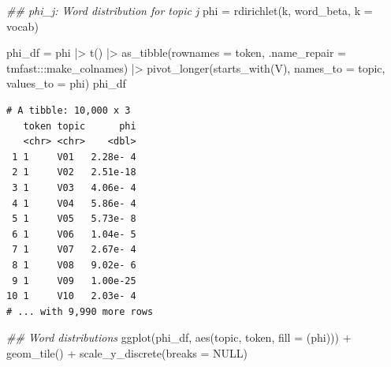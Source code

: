 \documentclass[
]{article}
\newenvironment{Shaded}{\begin{snugshade}}{\end{snugshade}}
\newcommand{\AttributeTok}[1]{\textcolor[rgb]{0.40,0.45,0.13}{#1}}
\newcommand{\ConstantTok}[1]{\textcolor[rgb]{0.56,0.35,0.01}{#1}}
\newcommand{\DocumentationTok}[1]{\textcolor[rgb]{0.37,0.37,0.37}{\textit{#1}}}
\newcommand{\FunctionTok}[1]{\textcolor[rgb]{0.28,0.35,0.67}{#1}}
\newcommand{\NormalTok}[1]{\textcolor[rgb]{0.00,0.23,0.31}{#1}}
\newcommand{\OtherTok}[1]{\textcolor[rgb]{0.00,0.23,0.31}{#1}}
\newcommand{\SpecialCharTok}[1]{\textcolor[rgb]{0.37,0.37,0.37}{#1}}
\newcommand{\StringTok}[1]{\textcolor[rgb]{0.13,0.47,0.30}{#1}}
\begin{document}
\begin{Shaded}
\begin{Highlighting}[]
\DocumentationTok{\#\# phi\_j:  Word distribution for topic j}
\NormalTok{phi }\OtherTok{=} \FunctionTok{rdirichlet}\NormalTok{(k, word\_beta, }\AttributeTok{k =}\NormalTok{ vocab)}

\NormalTok{phi\_df }\OtherTok{=}\NormalTok{ phi }\SpecialCharTok{|\textgreater{}}
    \FunctionTok{t}\NormalTok{() }\SpecialCharTok{|\textgreater{}} 
    \FunctionTok{as\_tibble}\NormalTok{(}\AttributeTok{rownames =} \StringTok{\textquotesingle{}token\textquotesingle{}}\NormalTok{, }
              \AttributeTok{.name\_repair =}\NormalTok{ tmfast}\SpecialCharTok{:::}\NormalTok{make\_colnames) }\SpecialCharTok{|\textgreater{}}
    \FunctionTok{pivot\_longer}\NormalTok{(}\FunctionTok{starts\_with}\NormalTok{(}\StringTok{\textquotesingle{}V\textquotesingle{}}\NormalTok{),}
                 \AttributeTok{names\_to =} \StringTok{\textquotesingle{}topic\textquotesingle{}}\NormalTok{,}
                 \AttributeTok{values\_to =} \StringTok{\textquotesingle{}phi\textquotesingle{}}\NormalTok{)}
\NormalTok{phi\_df}
\end{Highlighting}
\end{Shaded}

\begin{verbatim}
# A tibble: 10,000 x 3
   token topic      phi
   <chr> <chr>    <dbl>
 1 1     V01   2.28e- 4
 2 1     V02   2.51e-18
 3 1     V03   4.06e- 4
 4 1     V04   5.86e- 4
 5 1     V05   5.73e- 8
 6 1     V06   1.04e- 5
 7 1     V07   2.67e- 4
 8 1     V08   9.02e- 6
 9 1     V09   1.00e-25
10 1     V10   2.03e- 4
# ... with 9,990 more rows
\end{verbatim}

\begin{Shaded}
\begin{Highlighting}[]
\DocumentationTok{\#\# Word distributions}
\FunctionTok{ggplot}\NormalTok{(phi\_df, }\FunctionTok{aes}\NormalTok{(topic, token, }\AttributeTok{fill =}\NormalTok{ (phi))) }\SpecialCharTok{+}
    \FunctionTok{geom\_tile}\NormalTok{() }\SpecialCharTok{+}
    \FunctionTok{scale\_y\_discrete}\NormalTok{(}\AttributeTok{breaks =} \ConstantTok{NULL}\NormalTok{)}
\end{Highlighting}
\end{Shaded}
\end{document}
